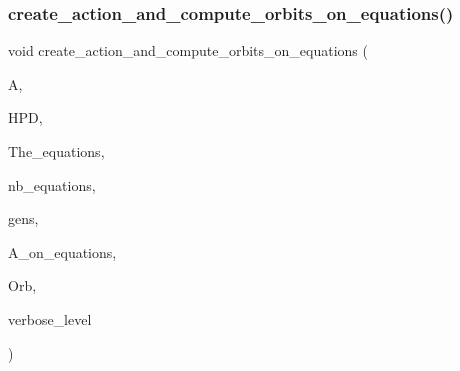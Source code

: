 \subsubsection{\texorpdfstring{create\+\_\+action\+\_\+and\+\_\+compute\+\_\+orbits\+\_\+on\+\_\+equations()}{create\_action\_and\_compute\_orbits\_on\_equations()}}
{\footnotesize\ttfamily void create\+\_\+action\+\_\+and\+\_\+compute\+\_\+orbits\+\_\+on\+\_\+equations (\begin{DoxyParamCaption}\item[{\mbox{\hyperlink{classaction}{action}} $\ast$}]{A,  }\item[{\mbox{\hyperlink{classhomogeneous__polynomial__domain}{homogeneous\+\_\+polynomial\+\_\+domain}} $\ast$}]{H\+PD,  }\item[{\mbox{\hyperlink{galois_8h_a09fddde158a3a20bd2dcadb609de11dc}{I\+NT}} $\ast$}]{The\+\_\+equations,  }\item[{\mbox{\hyperlink{galois_8h_a09fddde158a3a20bd2dcadb609de11dc}{I\+NT}}}]{nb\+\_\+equations,  }\item[{\mbox{\hyperlink{classstrong__generators}{strong\+\_\+generators}} $\ast$}]{gens,  }\item[{\mbox{\hyperlink{classaction}{action}} $\ast$\&}]{A\+\_\+on\+\_\+equations,  }\item[{\mbox{\hyperlink{classschreier}{schreier}} $\ast$\&}]{Orb,  }\item[{\mbox{\hyperlink{galois_8h_a09fddde158a3a20bd2dcadb609de11dc}{I\+NT}}}]{verbose\+\_\+level }\end{DoxyParamCaption})}

\mbox{\label{action__global_8_c_aa18c7217ecb245bf26dd9599241fd415}} 
